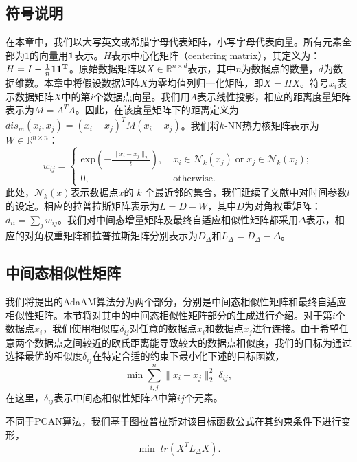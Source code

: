 \subsection{符号说明}
在本章中，我们以大写英文或希腊字母代表矩阵，小写字母代表向量。所有元素全部为$1$的向量用$\bf{1}$表示。$H$表示中心化矩阵（centering matrix），其定义为：$H = I-\frac{1}{n}\bf{1}\bf{1}^T$。原始数据矩阵以$X \in \mathbb{R}^{n\times d}$表示，其中$n$为数据点的数量，$d$为数据维数。本章中将假设数据矩阵$X$为零均值列归一化矩阵，即$X = HX$。符号$x_i$表示数据矩阵$X$中的第$i$个数据点向量。我们用$A$表示线性投影，相应的距离度量矩阵表示为$M = A^TA$。因此，在该度量矩阵下的距离定义为$dis_m(x_i, x_j) = (x_i - x_j)^TM(x_i - x_j)$。我们将$k$-NN热力核矩阵表示为$W \in \mathbb{R}^{n \times n}$：
\begin{equation}
	w_{ij} = \begin{cases} \mathrm{exp}(-\frac{\|x_i-x_j\|_{2}}{t}), \; &x_i\in\mathcal{N}_k(x_j)\;\mathrm{or}\; x_j\in\mathcal{N}_k(x_i);\\
		0, &\mathrm{otherwise.}\end{cases}          
\end{equation}
此处，$\mathcal{N}_k(x)$表示数据点$x$的 $k$ 个最近邻的集合，我们延续了文献\parencite{niyogi2004locality}中对时间参数$t$的设定。相应的拉普拉斯矩阵表示为$L=D-W$，其中$D$为对角权重矩阵：$d_{ii} = \sum_j w_{ij}$。我们对中间态增量矩阵及最终自适应相似性矩阵都采用$\Delta$表示，相应的对角权重矩阵和拉普拉斯矩阵分别表示为$D_\Delta$和$L_\Delta = D_\Delta-\Delta$。

\subsection{中间态相似性矩阵}
我们将提出的AdaAM算法分为两个部分，分别是中间态相似性矩阵和最终自适应相似性矩阵。本节将对其中的中间态相似性矩阵部分的生成进行介绍。对于第$i$个数据点$x_i$，我们使用相似度$\delta_{ij}$对任意的数据点$x_i$和数据点$x_j$进行连接。由于希望任意两个数据点之间较近的欧氏距离能导致较大的数据点相似度，我们的目标为通过选择最优的相似度$\delta_{ij}$在特定合适的约束下最小化下述的目标函数，
\begin{equation}
	\mathop{\mathrm{min}} \sum_{i,j}^{n} \|x_i-x_j\|_2^2\;\delta_{ij},
\end{equation}
在这里，$\delta_{ij}$表示中间态相似性矩阵$\Delta$中第$ij$个元素。

不同于PCAN算法\cite{nie2014clustering}，我们基于图拉普拉斯对该目标函数公式在其约束条件下进行变形，
\begin{equation}
	\mathop{\mathrm{min}}\; tr(X^TL_\Delta X).
	\label{eq2:Delta}
\end{equation}

